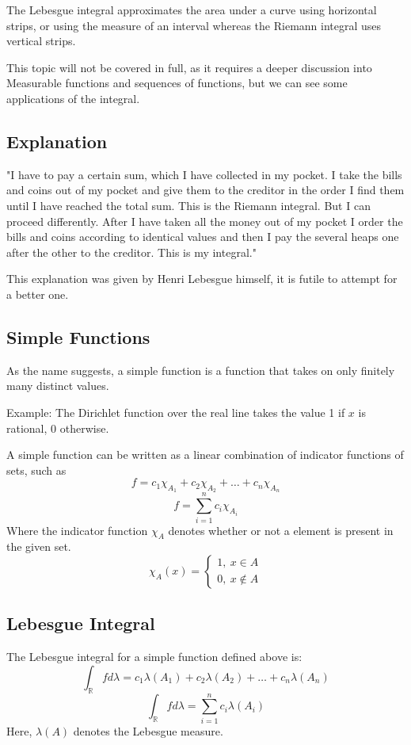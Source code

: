 \documentclass{article}
\begin{document}
The Lebesgue integral approximates the area under a curve using horizontal strips, or using the measure of an interval whereas the Riemann integral uses vertical strips.

This topic will not be covered in full, as it requires a deeper discussion into Measurable functions and sequences of functions, but we can see some applications of the integral.

\subsection{Explanation}

\begin{center}
    "I have to pay a certain sum, which I have collected in my pocket. I take the bills and coins out of my pocket and give them to the creditor in the order I find them until I have reached the total sum. This is the Riemann integral. But I can proceed differently. After I have taken all the money out of my pocket I order the bills and coins according to identical values and then I pay the several heaps one after the other to the creditor. This is my integral."
\end{center}

This explanation was given by Henri Lebesgue himself, it is futile to attempt for a better one.

\subsection{Simple Functions}
As the name suggests, a simple function is a function that takes on only finitely many distinct values. 

Example: The Dirichlet function over the real line takes the value 1 if $x$ is rational, 0 otherwise.

A simple function can be written as a linear combination of indicator functions of sets, such as
$$f = c_1\chi_{A_1} +c_2\chi_{A_2}+\dots+c_n\chi_{A_n}$$
$$f = \sum \limits_{i=1}^nc_i\chi_{A_i}$$
Where the indicator function $\chi_A$ denotes whether or not a element is present in the given set.
$$\chi_A(x)=\begin{cases} 
    1 ,\ x \in A \\
    0 ,\ x \notin A
   \end{cases}$$
\subsection{Lebesgue Integral}
The Lebesgue integral for a simple function defined above is:
$$ \int_{\mathbb{R}} fd{\lambda}=c_1\lambda (A_1)+c_2\lambda (A_2)+\dots+c_n\lambda (A_n)$$
$$ \int_{\mathbb{R}} fd{\lambda}=\sum \limits_{i=1}^n c_i\lambda (A_i)$$
Here, $\lambda(A)$ denotes the Lebesgue measure.
\end{document}
